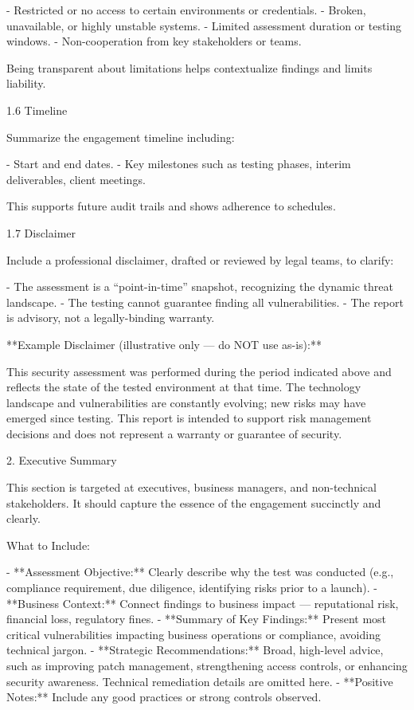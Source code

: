 - Restricted or no access to certain environments or credentials.
- Broken, unavailable, or highly unstable systems.
- Limited assessment duration or testing windows.
- Non-cooperation from key stakeholders or teams.

Being transparent about limitations helps contextualize findings and limits liability.

1.6 Timeline

Summarize the engagement timeline including:

- Start and end dates.
- Key milestones such as testing phases, interim deliverables, client meetings.

This supports future audit trails and shows adherence to schedules.

1.7 Disclaimer

Include a professional disclaimer, drafted or reviewed by legal teams, to clarify:

- The assessment is a “point-in-time” snapshot, recognizing the dynamic threat landscape.
- The testing cannot guarantee finding all vulnerabilities.
- The report is advisory, not a legally-binding warranty.

**Example Disclaimer (illustrative only — do NOT use as-is):**

This security assessment was performed during the period indicated above and reflects the state of the tested environment at that time. The technology landscape and vulnerabilities are constantly evolving; new risks may have emerged since testing. This report is intended to support risk management decisions and does not represent a warranty or guarantee of security.



2. Executive Summary

This section is targeted at executives, business managers, and non-technical stakeholders. It should capture the essence of the engagement succinctly and clearly.

What to Include:

- **Assessment Objective:** Clearly describe why the test was conducted (e.g., compliance requirement, due diligence, identifying risks prior to a launch).
- **Business Context:** Connect findings to business impact — reputational risk, financial loss, regulatory fines.
- **Summary of Key Findings:** Present most critical vulnerabilities impacting business operations or compliance, avoiding technical jargon.
- **Strategic Recommendations:** Broad, high-level advice, such as improving patch management, strengthening access controls, or enhancing security awareness. Technical remediation details are omitted here.
- **Positive Notes:** Include any good practices or strong controls observed.

